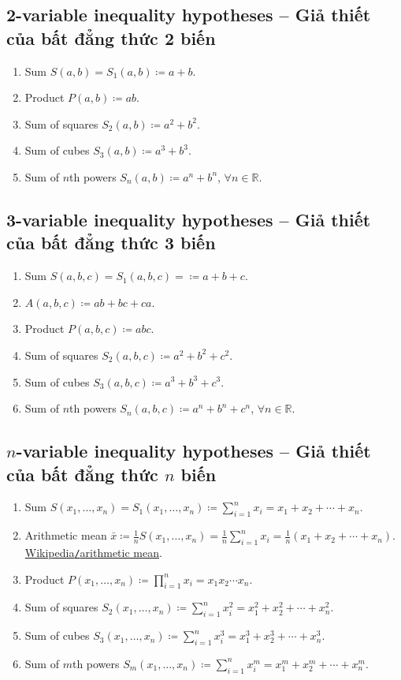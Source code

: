 \documentclass{article}
\begin{document}
\subsection{2-variable inequality hypotheses -- Giả thiết của bất đẳng thức 2 biến}

\begin{enumerate}
	\item Sum $S(a,b) = S_1(a,b)\coloneqq a + b$.
	\item Product $P(a,b)\coloneqq ab$.
	\item Sum of squares $S_2(a,b)\coloneqq a^2 + b^2$.
	\item Sum of cubes $S_3(a,b)\coloneqq a^3 + b^3$.
	\item Sum of $n$th powers $S_n(a,b)\coloneqq a^n + b^n$, $\forall n\in\mathbb{R}$.
\end{enumerate}

\subsection{3-variable inequality hypotheses -- Giả thiết của bất đẳng thức 3 biến}

\begin{enumerate}
	\item Sum $S(a,b,c) = S_1(a,b,c) = \coloneqq a + b + c$.
	\item $A(a,b,c)\coloneqq ab + bc + ca$.
	\item Product $P(a,b,c)\coloneqq abc$.
	\item Sum of squares $S_2(a,b,c)\coloneqq a^2 + b^2 + c^2$.
	\item Sum of cubes $S_3(a,b,c)\coloneqq a^3 + b^3 + c^3$.
	\item Sum of $n$th powers $S_n(a,b,c)\coloneqq a^n + b^n + c^n$, $\forall n\in\mathbb{R}$.
\end{enumerate}

\subsection{$n$-variable inequality hypotheses -- Giả thiết của bất đẳng thức $n$ biến}

\begin{enumerate}
	\item Sum $S(x_1,\ldots,x_n) = S_1(x_1,\ldots,x_n)\coloneqq\sum_{i=1}^n x_i = x_1 + x_2 + \cdots + x_n$.
	\item Arithmetic mean $\bar{x}\coloneqq\frac{1}{n}S(x_1,\ldots,x_n) = \frac{1}{n}\sum_{i=1}^n x_i = \frac{1}{n}(x_1 + x_2 + \cdots + x_n)$. \href{https://en.wikipedia.org/wiki/Arithmetic_mean}{Wikipedia{\tt/}arithmetic mean}.
	\item Product $P(x_1,\ldots,x_n)\coloneqq\prod_{i=1}^n x_i = x_1x_2\cdots x_n$.
	\item Sum of squares $S_2(x_1,\ldots,x_n)\coloneqq\sum_{i=1}^n x_i^2 = x_1^2 + x_2^2 + \cdots + x_n^2$.
	\item Sum of cubes $S_3(x_1,\ldots,x_n)\coloneqq\sum_{i=1}^n x_i^3 = x_1^3 + x_2^3 + \cdots + x_n^3$.
	\item Sum of $m$th powers $S_m(x_1,\ldots,x_n)\coloneqq\sum_{i=1}^n x_i^m = x_1^m + x_2^m + \cdots + x_n^m$.
\end{enumerate}
\end{document}
